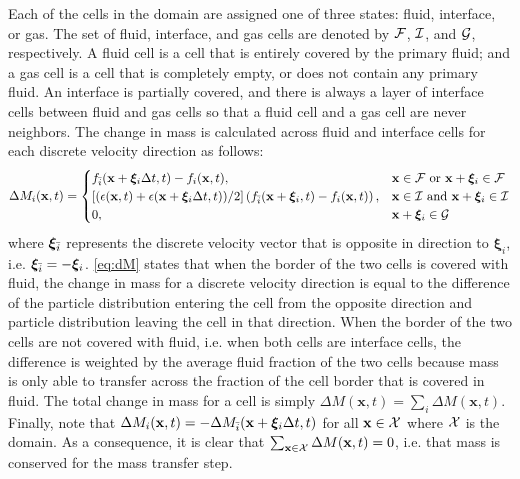 \documentclass[pdftex,ms]{pittetd}
\newcommand{\pos}{\mathbf{x}}
\newcommand{\pvel}{\boldsymbol{\xi}}
\begin{document}
Each of the cells in the domain are assigned one of three states: fluid, interface, or gas.
The set of fluid, interface, and gas cells are denoted by $\mathcal{F}$, $\mathcal{I}$, and $\mathcal{G}$, respectively.
A fluid cell is a cell that is entirely covered by the primary fluid; and a gas cell is a cell that is completely empty, or does not contain any primary fluid.
An interface is partially covered, and there is always a layer of interface cells between fluid and gas cells so that a fluid cell and a gas cell are never neighbors.
The change in mass is calculated across fluid and interface cells for each discrete velocity direction as follows:
\begin{equation} \label{eq:dM}
\Delta M_i(\pos, t) = \begin{cases}
f_\opidx(\pos + \pvel_i \Delta t, t) - f_i(\pos, t), & \pos \in \fset \text{ or } \pos + \pvel_i \in \fset \\
\left[(\epsilon(\pos, t) + \epsilon(\pos + \pvel_i \Delta t, t)) / 2\right]\left(f_\opidx(\pos + \pvel_i, t) - f_i(\pos, t)\right), & \pos \in \iset \text{ and } \pos + \pvel_i \in \iset \\
0, & \pos + \pvel_i \in \gset
\end{cases}
\end{equation}
\noindent where $\pvel_\opidx$ represents the discrete velocity vector that is opposite in direction to $\pvel_i$, i.e. $\pvel_\opidx = - \pvel_i$.
\eqref{eq:dM} states that when the border of the two cells is covered with fluid, the change in mass for a discrete velocity direction is equal to the difference of the particle distribution entering the cell from the opposite direction and particle distribution leaving the cell in that direction.
When the border of the two cells are not covered with fluid, i.e. when both cells are interface cells, the difference is weighted by the average fluid fraction of the two cells because mass is only able to transfer across the fraction of the cell border that is covered in fluid.
The total change in mass for a cell is simply $\Delta M(\pos, t) = \sum_i \Delta M(\pos, t)$.
Finally, note that $\Delta M_i(\pos, t) = -\Delta M_\opidx(\pos + \pvel_i \Delta t, t)$ for all $\pos \in \domain$ where $\mathcal{X}$ is the domain.
As a consequence, it is clear that $\sum_{\pos \in \domain}\Delta M(\pos, t) = 0$, i.e. that mass is conserved for the mass transfer step.

\newcommand{\tconst}{\delta_{trans}}
\end{document}
